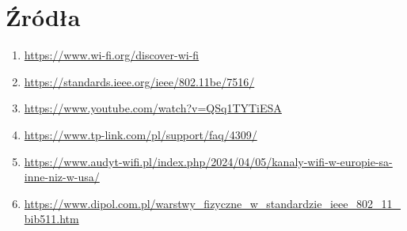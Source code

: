 \documentclass{article}
\begin{document}
    \section{Źródła}
        \begin{enumerate}[label=\arabic*.]
            \item \url{https://www.wi-fi.org/discover-wi-fi}
            \item \url{https://standards.ieee.org/ieee/802.11be/7516/}
            \item \url{https://www.youtube.com/watch?v=QSq1TYTiESA}
            \item \url{https://www.tp-link.com/pl/support/faq/4309/}
            \item \url{https://www.audyt-wifi.pl/index.php/2024/04/05/kanaly-wifi-w-europie-sa-inne-niz-w-usa/}
            \item \url{https://www.dipol.com.pl/warstwy_fizyczne_w_standardzie_ieee_802_11_bib511.htm}
        \end{enumerate}
\end{document}
